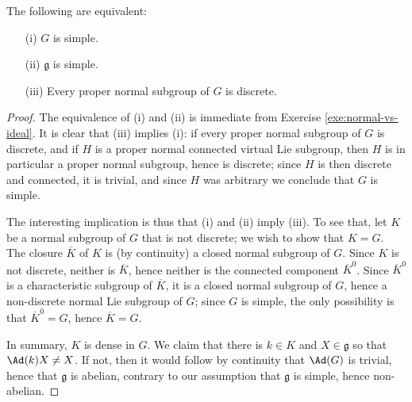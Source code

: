\documentclass[reqno]{amsart} 
\begin{document}
\begin{lemma}
  The following are equivalent:
  \begin{enumerate}
  \item[(i)] $G$ is simple.
  \item[(ii)] $\mathfrak{g}$ is simple.
  \item[(iii)] Every proper normal subgroup of $G$ is discrete.
  \end{enumerate}
\end{lemma}
\begin{proof}
  The equivalence of (i) and (ii) is immediate from Exercise \ref{exe:normal-vs-ideal}.  It is clear that (iii) implies (i): if every proper normal subgroup of $G$ is discrete, and if $H$ is a proper normal connected virtual Lie subgroup, then $H$ is in particular a proper normal subgroup, hence is discrete; since $H$ is then discrete and connected, it is trivial, and since $H$ was arbitrary we conclude that $G$ is simple.

  The interesting implication is thus that (i) and (ii) imply (iii).  To see that, let $K$ be a normal subgroup of $G$ that is not discrete; we wish to show that $K = G$.  The closure $\overline{K}$ of $K$ is (by continuity) a closed normal subgroup of $G$.  Since $K$ is not discrete, neither is $\overline{K}$, hence neither is the connected component $\overline{K}^0$.  Since $\overline{K}^0$ is a characteristic subgroup of $\overline{K}$, it is a closed normal subgroup of $G$, hence a non-discrete normal Lie subgroup of $G$; since $G$ is simple, the only possibility is that $\overline{K}^0 = G$, hence $\overline{K} = G$.

  In summary, $K$ is dense in $G$.  We claim that there is $k \in K$ and $X \in \mathfrak{g}$ so that $\Ad(k) X \neq X$.  If not, then it would follow by continuity that $\Ad(G)$ is trivial, hence that $\mathfrak{g}$ is abelian, contrary to our assumption that $\mathfrak{g}$ is simple, hence non-abelian.


\end{proof}
\end{document}
